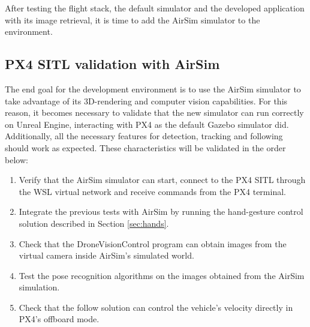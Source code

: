 After testing the flight stack, the default simulator and the developed application with its image retrieval, it is time to add the AirSim simulator to the environment.



\subsection{PX4 SITL validation with AirSim}
\label{sec:test-3-airsim}

The end goal for the development environment is to use the AirSim simulator to take advantage of its 3D-rendering and computer vision capabilities.
For this reason, it becomes necessary to validate that the new simulator can run correctly on Unreal Engine, interacting with PX4 as the default Gazebo simulator did. Additionally, all the necessary features for detection, tracking and following should work as expected.
These characteristics will be validated in the order below:
\begin{enumerate}
    \item Verify that the AirSim simulator can start, connect to the PX4 SITL through the WSL virtual network and receive commands from the PX4 terminal.
    \item Integrate the previous tests with AirSim by running the hand-gesture control solution described in Section \ref{sec:hands}.
    \item Check that the DroneVisionControl program can obtain images from the virtual camera inside AirSim's simulated world.
    \item Test the pose recognition algorithms on the images obtained from the AirSim simulation.
    \item Check that the follow solution can control the vehicle's velocity directly in PX4's offboard mode.
\end{enumerate}

